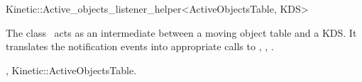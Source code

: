 

\begin{ccRefClass}{Kinetic::Active_objects_listener_helper<ActiveObjectsTable, KDS>}  %


\ccDefinition
  
The class \ccRefName\ acts as an intermediate between a moving object
table and a KDS. It translates the
 notification events into
appropriate calls to , ,
.



\ccSeeAlso

,
Kinetic::ActiveObjectsTable.


\end{ccRefClass}


